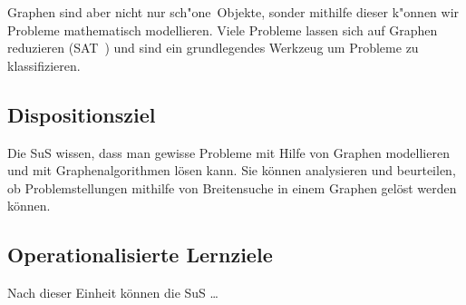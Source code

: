 Graphen sind aber nicht nur \glqq sch"one\grqq\ Objekte, sonder mithilfe dieser k"onnen wir Probleme mathematisch modellieren. 
Viele Probleme lassen sich auf Graphen reduzieren (SAT~\cite{hrom1}) und sind ein grundlegendes Werkzeug um Probleme zu klassifizieren.


\subsection{Dispositionsziel}

Die SuS wissen, dass man gewisse Probleme mit Hilfe von Graphen modellieren und mit Graphenalgorithmen lösen kann. 
Sie können analysieren und beurteilen, ob Problemstellungen mithilfe von Breitensuche in einem Graphen gelöst werden können.



\subsection{Operationalisierte Lernziele}

Nach dieser Einheit können die SuS \dots

